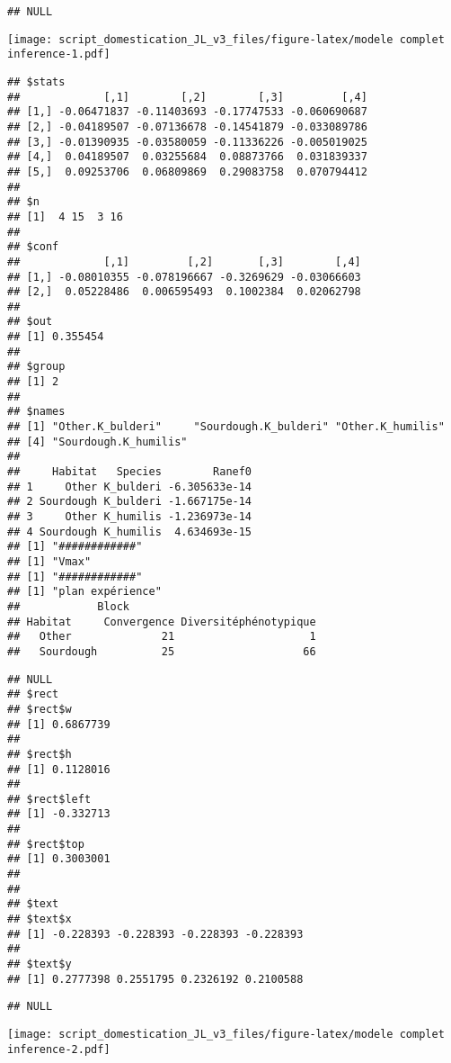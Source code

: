 \documentclass[
]{article}
\begin{document}
\begin{verbatim}
## NULL
\end{verbatim}

\texttt{[image: script\_domestication\_JL\_v3\_files/figure-latex/modele complet inference-1.pdf]}

\begin{verbatim}
## $stats
##             [,1]        [,2]        [,3]         [,4]
## [1,] -0.06471837 -0.11403693 -0.17747533 -0.060690687
## [2,] -0.04189507 -0.07136678 -0.14541879 -0.033089786
## [3,] -0.01390935 -0.03580059 -0.11336226 -0.005019025
## [4,]  0.04189507  0.03255684  0.08873766  0.031839337
## [5,]  0.09253706  0.06809869  0.29083758  0.070794412
## 
## $n
## [1]  4 15  3 16
## 
## $conf
##             [,1]         [,2]       [,3]        [,4]
## [1,] -0.08010355 -0.078196667 -0.3269629 -0.03066603
## [2,]  0.05228486  0.006595493  0.1002384  0.02062798
## 
## $out
## [1] 0.355454
## 
## $group
## [1] 2
## 
## $names
## [1] "Other.K_bulderi"     "Sourdough.K_bulderi" "Other.K_humilis"    
## [4] "Sourdough.K_humilis"
## 
##     Habitat   Species        Ranef0
## 1     Other K_bulderi -6.305633e-14
## 2 Sourdough K_bulderi -1.667175e-14
## 3     Other K_humilis -1.236973e-14
## 4 Sourdough K_humilis  4.634693e-15
## [1] "############"
## [1] "Vmax"
## [1] "############"
## [1] "plan expérience"
##            Block
## Habitat     Convergence Diversitéphénotypique
##   Other              21                     1
##   Sourdough          25                    66
\end{verbatim}

\begin{verbatim}
## NULL
## $rect
## $rect$w
## [1] 0.6867739
## 
## $rect$h
## [1] 0.1128016
## 
## $rect$left
## [1] -0.332713
## 
## $rect$top
## [1] 0.3003001
## 
## 
## $text
## $text$x
## [1] -0.228393 -0.228393 -0.228393 -0.228393
## 
## $text$y
## [1] 0.2777398 0.2551795 0.2326192 0.2100588
\end{verbatim}

\begin{verbatim}
## NULL
\end{verbatim}

\texttt{[image: script\_domestication\_JL\_v3\_files/figure-latex/modele complet inference-2.pdf]}
\end{document}
